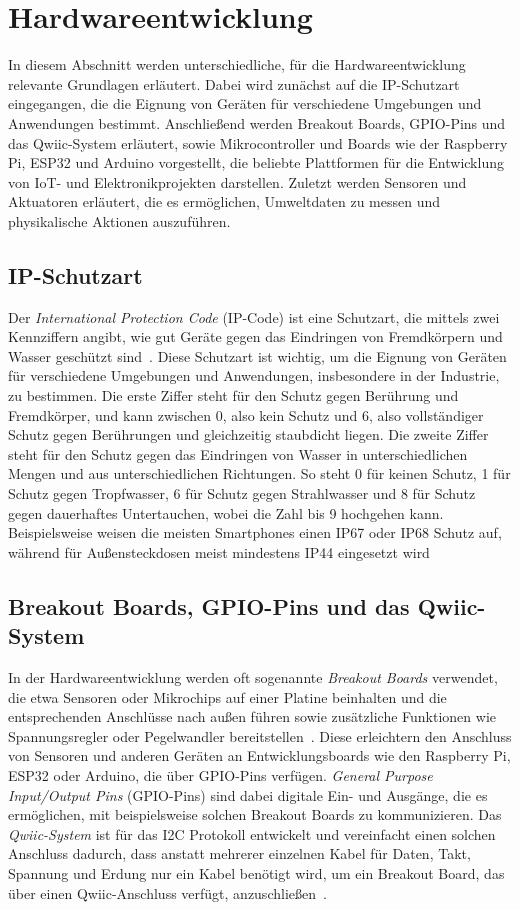 \section{Hardwareentwicklung}
In diesem Abschnitt werden unterschiedliche, für die Hardwareentwicklung relevante Grundlagen erläutert.
Dabei wird zunächst auf die IP-Schutzart eingegangen, die die Eignung von Geräten für verschiedene Umgebungen und Anwendungen bestimmt.
Anschließend werden Breakout Boards, GPIO-Pins und das Qwiic-System erläutert, sowie Mikrocontroller und Boards wie der Raspberry Pi, ESP32 und Arduino vorgestellt, die beliebte Plattformen für die Entwicklung von IoT- und Elektronikprojekten darstellen.
Zuletzt werden Sensoren und Aktuatoren erläutert, die es ermöglichen, Umweltdaten zu messen und physikalische Aktionen auszuführen.


\subsection*{IP-Schutzart}
Der \emph{International Protection Code} (IP-Code) ist eine Schutzart, die mittels zwei Kennziffern angibt, wie gut Geräte gegen das Eindringen von Fremdkörpern und Wasser geschützt sind~\cite{IPCode}.
Diese Schutzart ist wichtig, um die Eignung von Geräten für verschiedene Umgebungen und Anwendungen, insbesondere in der Industrie, zu bestimmen.
Die erste Ziffer steht für den Schutz gegen Berührung und Fremdkörper, und kann zwischen 0, also kein Schutz und 6, also vollständiger Schutz gegen Berührungen und gleichzeitig staubdicht liegen.
Die zweite Ziffer steht für den Schutz gegen das Eindringen von Wasser in unterschiedlichen Mengen und aus unterschiedlichen Richtungen.
So steht 0 für keinen Schutz, 1 für Schutz gegen Tropfwasser, 6 für Schutz gegen Strahlwasser und 8 für Schutz gegen dauerhaftes Untertauchen, wobei die Zahl bis 9 hochgehen kann.
Beispielsweise weisen die meisten Smartphones einen IP67 oder IP68 Schutz auf, während für Außensteckdosen meist mindestens IP44 eingesetzt wird


\subsection*{Breakout Boards, GPIO-Pins und das Qwiic-System}
In der Hardwareentwicklung werden oft sogenannte \emph{Breakout Boards} verwendet, die etwa Sensoren oder Mikrochips auf einer Platine beinhalten und die entsprechenden Anschlüsse nach außen führen sowie zusätzliche Funktionen wie Spannungsregler oder Pegelwandler bereitstellen~\cite{Breakout}.
Diese erleichtern den Anschluss von Sensoren und anderen Geräten an Entwicklungsboards wie den Raspberry Pi, ESP32 oder Arduino, die über GPIO-Pins verfügen.
\emph{General Purpose Input/Output Pins} (GPIO-Pins) sind dabei digitale Ein- und Ausgänge, die es ermöglichen, mit beispielsweise solchen Breakout Boards zu kommunizieren.
Das \emph{Qwiic-System} ist für das I2C Protokoll entwickelt und vereinfacht einen solchen Anschluss dadurch, dass anstatt mehrerer einzelnen Kabel für Daten, Takt, Spannung und Erdung nur ein Kabel benötigt wird, um ein Breakout Board, das über einen Qwiic-Anschluss verfügt, anzuschließen~\cite{Qwiic}.


